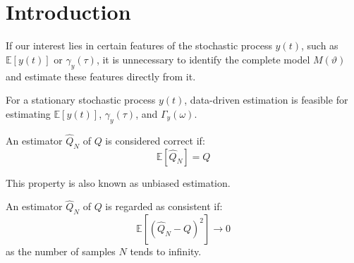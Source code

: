 \section{Introduction}

If our interest lies in certain features of the stochastic process $y(t)$, such as $\mathbb{E}[y(t)]$ or $\gamma_y(\tau)$, it is unnecessary to identify the complete model $M(\vartheta)$ and estimate these features directly from it.

For a stationary stochastic process $y(t)$, data-driven estimation is feasible for estimating $\mathbb{E}[y(t)]$, $\gamma_y(\tau)$, and $\Gamma_y(\omega)$.

\begin{definition}
    An estimator $\hat{Q}_N$ of $Q$ is considered correct if:
    \[\mathbb{E}\left[\hat{Q}_N\right]=Q\]
\end{definition}
This property is also known as unbiased estimation.
\begin{definition}
    An estimator $\hat{Q}_N$ of $Q$ is regarded as consistent if:
    \[\mathbb{E}\left[\left(\hat{Q}_N-Q\right)^2\right]\rightarrow 0\]
    as the number of samples $N$ tends to infinity.
\end{definition}